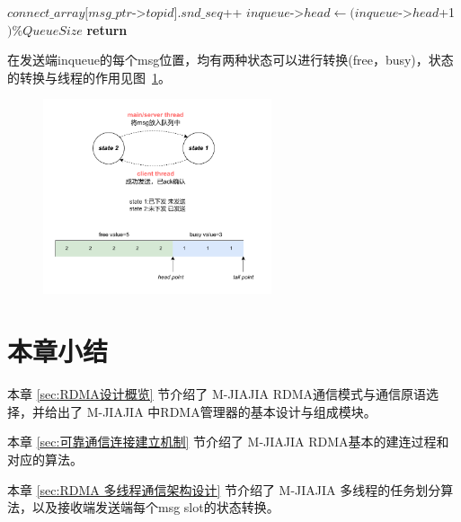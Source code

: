 {\begin{itemize}
\begin{algorithm}
\begin{algorithmic}[1]
                      \State
                      \State $connect\_array[msg\_ptr$->$topid].snd\_seq$++
                      \State $inqueue$->$head \gets (inqueue$->$head$+1$) \% QueueSize$
                      \State {}
                      \EndWhile
                      \State \textbf{return}
                      \EndProcedure
                  \end{algorithmic}
              \end{algorithm}
    \end{itemize}

    在发送端inqueue的每个msg位置，均有两种状态可以进行转换(free，busy)，状态的转换与线程的作用见图~\ref{fig:RDMA-send-state}。
    \begin{figure}[H]
        \centering
        \includegraphics[width=0.6\textwidth]{Img/send_state.drawio.pdf}
        \label{fig:RDMA-send-state}
    \end{figure}

    \section{本章小结}
    本章 \ref{sec:RDMA设计概览} 节介绍了 M-JIAJIA RDMA通信模式与通信原语选择，并给出了 M-JIAJIA 中RDMA管理器的基本设计与组成模块。

    本章 \ref{sec:可靠通信连接建立机制} 节介绍了 M-JIAJIA RDMA基本的建连过程和对应的算法。

    本章 \ref{sec:RDMA 多线程通信架构设计} 节介绍了 M-JIAJIA 多线程的任务划分算法，以及接收端发送端每个msg slot的状态转换。
}